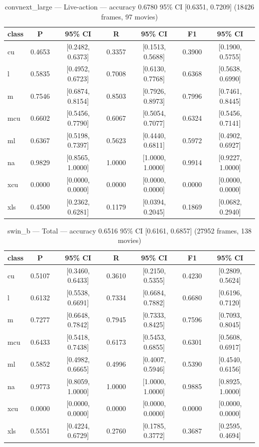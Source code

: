 \begin{table}[htbp]
\centering
\caption{convnext\_large — Live-action — accuracy 0.6780 95\% CI [0.6351, 0.7209] (18426 frames, 97 movies)}
\label{tab:convnext-large-live-action}
\begin{tabular}{lcccccc}
\toprule
class & P & 95\% CI & R & 95\% CI & F1 & 95\% CI \\
\midrule
cu & 0.4653 & [0.2482, 0.6373] & 0.3357 & [0.1513, 0.5688] & 0.3900 & [0.1900, 0.5755] \\
l & 0.5835 & [0.4952, 0.6723] & 0.7008 & [0.6130, 0.7768] & 0.6368 & [0.5638, 0.6990] \\
m & 0.7546 & [0.6874, 0.8154] & 0.8503 & [0.7926, 0.8973] & 0.7996 & [0.7461, 0.8445] \\
mcu & 0.6602 & [0.5456, 0.7790] & 0.6067 & [0.5054, 0.7077] & 0.6324 & [0.5456, 0.7141] \\
ml & 0.6367 & [0.5198, 0.7397] & 0.5623 & [0.4440, 0.6811] & 0.5972 & [0.4902, 0.6927] \\
na & 0.9829 & [0.8565, 1.0000] & 1.0000 & [1.0000, 1.0000] & 0.9914 & [0.9227, 1.0000] \\
xcu & 0.0000 & [0.0000, 0.0000] & 0.0000 & [0.0000, 0.0000] & 0.0000 & [0.0000, 0.0000] \\
xls & 0.4500 & [0.2362, 0.6281] & 0.1179 & [0.0394, 0.2045] & 0.1869 & [0.0682, 0.2940] \\
\bottomrule
\end{tabular}
\end{table}

\begin{table}[htbp]
\centering
\caption{swin\_b — Total — accuracy 0.6516 95\% CI [0.6161, 0.6857] (27952 frames, 138 movies)}
\label{tab:swin-b-total}
\begin{tabular}{lcccccc}
\toprule
class & P & 95\% CI & R & 95\% CI & F1 & 95\% CI \\
\midrule
cu & 0.5107 & [0.3460, 0.6433] & 0.3610 & [0.2150, 0.5355] & 0.4230 & [0.2809, 0.5624] \\
l & 0.6132 & [0.5538, 0.6691] & 0.7334 & [0.6684, 0.7882] & 0.6680 & [0.6196, 0.7120] \\
m & 0.7277 & [0.6648, 0.7842] & 0.7945 & [0.7333, 0.8425] & 0.7596 & [0.7093, 0.8045] \\
mcu & 0.6433 & [0.5418, 0.7438] & 0.6173 & [0.5453, 0.6855] & 0.6301 & [0.5608, 0.6917] \\
ml & 0.5852 & [0.4982, 0.6665] & 0.4996 & [0.4007, 0.5946] & 0.5390 & [0.4540, 0.6156] \\
na & 0.9773 & [0.8059, 1.0000] & 1.0000 & [1.0000, 1.0000] & 0.9885 & [0.8925, 1.0000] \\
xcu & 0.0000 & [0.0000, 0.0000] & 0.0000 & [0.0000, 0.0000] & 0.0000 & [0.0000, 0.0000] \\
xls & 0.5551 & [0.4224, 0.6729] & 0.2760 & [0.1785, 0.3772] & 0.3687 & [0.2595, 0.4694] \\
\bottomrule
\end{tabular}
\end{table}

